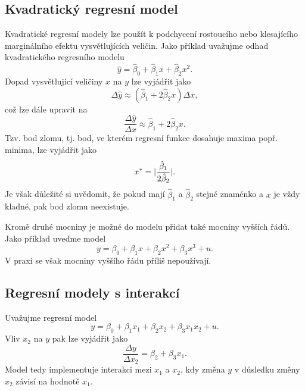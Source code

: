 \subsection{Kvadratický regresní model}

Kvadratické regresní modely lze použít k podchycení rostoucího nebo klesajícího marginálního efektu vysvětlujících veličin. Jako 
příklad uvažujme odhad kvadratického regresního modelu
\begin{equation}
\hat{y} = \hat{\beta}_0 + \hat{\beta}_1 x + \hat{\beta}_2 x^2.
\end{equation}
Dopad vysvětlující veličiny $x$ na $y$ lze vyjádřit jako
\begin{equation}
\Delta \hat{y} \approx (\hat{\beta}_1 + 2 \hat{\beta}_2 x) \Delta x,
\end{equation}
což lze dále upravit na
\begin{equation}
\frac{\Delta \hat{y}}{\Delta x} \approx \hat{\beta}_1 + 2 \hat{\beta}_2 x.
\end{equation}
Tzv. bod zlomu, tj. bod, ve kterém regresní funkce dosahuje maxima popř. minima, lze vyjádřit jako
\begin{equation}
x^* = \arrowvert \frac{\hat{\beta}_1}{2 \hat{\beta}_2} \arrowvert.
\end{equation}
Je však důležité si uvědomit, že pokud mají $\hat{\beta}_1$ a $\hat{\beta}_2$ stejné znaménko a $x$ je vždy kladné, pak bod zlomu neexistuje.

Kromě druhé mocniny je možné do modelu přidat také mocniny vyšších řádů. Jako příklad uveďme model
\begin{equation}
y = \beta_0 + \beta_1 x + \beta_2 x^2 + \beta_3 x^3 + u.
\end{equation}
V praxi se však mocniny vyššího řádu příliš nepoužívají.

\subsection{Regresní modely s interakcí}

Uvažujme regresní model
\begin{equation}
y = \beta_0 + \beta_1 x_1 + \beta_2 x_2 + \beta_3 x_1 x_2 + u.
\end{equation}
Vliv $x_2$ na $y$ pak lze vyjádřit jako
\begin{equation}
\frac{\Delta y}{\Delta x_2} = \beta_2 + \beta_3 x_1.
\end{equation}
Model tedy implementuje interakci mezi $x_1$ a $x_2$, kdy změna $y$ v důsledku změny $x_2$ závisí na hodnotě $x_1$.

